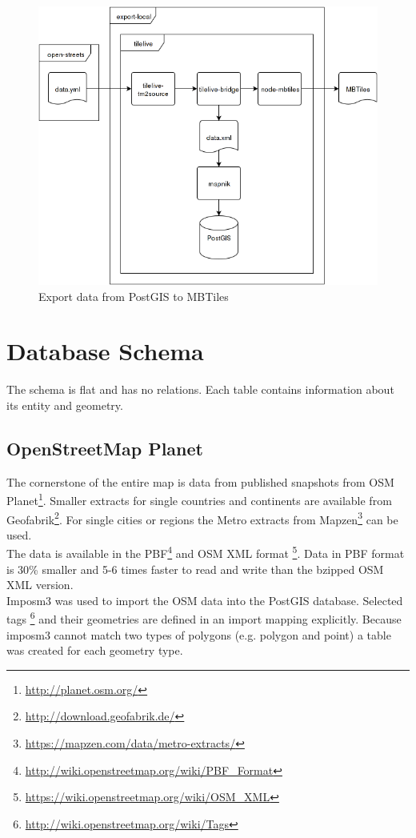 \begin{figure}[H]
\centering
  \includegraphics[scale=0.6]{images/export_package_flow.png}
  \caption{Export data from PostGIS to MBTiles}
\end{figure}

\newpage
\section{Database Schema}\label{database-schema}
The schema is flat and has no relations. Each table contains information about its entity and geometry. 

\subsection{OpenStreetMap Planet}

The cornerstone of the entire map is \osm{} data from published snapshots from OSM Planet\footnote{\url{http://planet.osm.org/}}.
Smaller extracts for single countries and continents are available from Geofabrik\footnote{\url{http://download.geofabrik.de/}}.
For  single cities or regions the Metro extracts from Mapzen\footnote{\url{https://mapzen.com/data/metro-extracts/}} can be used.
\\
The data is available in the PBF\footnote{\url{http://wiki.openstreetmap.org/wiki/PBF_Format}} and OSM XML format \footnote{\url{https://wiki.openstreetmap.org/wiki/OSM_XML}}. 
Data in PBF format is 30\% smaller and 5-6 times faster to read and write than the bzipped OSM XML version.
\\
Imposm3 was used to import the OSM data into the PostGIS database.
Selected tags \footnote{\url{http://wiki.openstreetmap.org/wiki/Tags}} and their geometries are defined in an import mapping explicitly.
Because imposm3 cannot match two types of polygons (e.g. polygon and point) a table was created for each geometry type.

